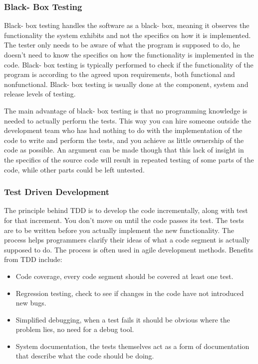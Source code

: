 \subsubsection{Black- Box Testing}
Black- box testing handles the software as a black- box, meaning it observes the functionality the system exhibits and not the specifics on how it is implemented. The tester only needs to be aware of what the program is supposed to do, he doesn't need to know the specifics on how the functionality is implemented in the code. Black- box testing is typically performed to check if the functionality of the program is according to the agreed upon requirements, both functional and nonfunctional. Black- box testing is usually done at the component, system and release levels of testing.

The main advantage of black- box testing is that no programming knowledge is needed to actually perform the tests. This way you can hire someone outside the development team who has had nothing to do with the implementation of the code to write and perform the tests, and you achieve as little ownership of the code as possible. An argument can be made though that this lack of insight in the specifics of the source code will result in repeated testing of some parts of the code, while other parts could be left untested.

\subsubsection{Test Driven Development}
The principle behind TDD is to develop the code incrementally, along with test for that increment. You don’t move on until the code passes its test. The tests are to be written before you actually implement the new functionality. The process helps programmers clarify their ideas of what a code segment is actually supposed to do. The process is often used in agile development methods.
Benefits from TDD include: 
\begin{itemize}

\item Code coverage, every code segment should be covered at least one test.

\item Regression testing, check to see if changes in the code have not introduced new bugs.

\item Simplified debugging, when a test fails it should be obvious where the problem lies, no need for a debug tool.

\item System documentation, the tests themselves act as a form of documentation that describe what the code should be doing.

\end{itemize}

